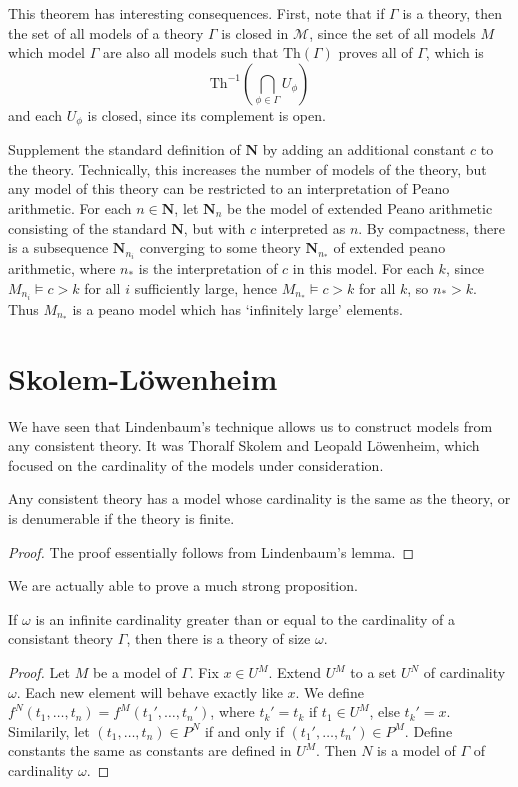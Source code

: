 This theorem has interesting consequences. First, note that if $\Gamma$ is a theory, then the set of all models of a theory $\Gamma$ is closed in $\mathcal{M}$, since the set of all models $M$ which model $\Gamma$ are also all models such that $\text{Th}(\Gamma)$ proves all of $\Gamma$, which is
%
\[ \text{Th}^{-1} \left(\bigcap_{\phi \in \Gamma} U_\phi \right) \]
%
and each $U_\phi$ is closed, since its complement is open.

\begin{example}
    Supplement the standard definition of $\mathbf{N}$ by adding an additional constant $c$ to the theory. Technically, this increases the number of models of the theory, but any model of this theory can be restricted to an interpretation of Peano arithmetic. For each $n \in \mathbf{N}$, let $\mathbf{N}_n$ be the model of extended Peano arithmetic consisting of the standard $\mathbf{N}$, but with $c$ interpreted as $n$. By compactness, there is a subsequence $\mathbf{N}_{n_i}$ converging to some theory $\mathbf{N}_{n_*}$ of extended peano arithmetic, where $n_*$ is the interpretation of $c$ in this model. For each $k$, since $M_{n_i} \vDash c > k$ for all $i$ sufficiently large, hence $M_{n_*} \vDash c > k$ for all $k$, so $n_* > k$. Thus $M_{n_*}$ is a peano model which has `infinitely large' elements.
\end{example}

\section{Skolem-L\"{o}wenheim}

We have seen that Lindenbaum's technique allows us to construct models from any consistent theory. It was Thoralf Skolem and Leopald L\"{o}wenheim, which focused on the cardinality of the models under consideration.

\begin{theorem}
    Any consistent theory has a model whose cardinality is the same as the theory, or is denumerable if the theory is finite.
\end{theorem}
\begin{proof}
    The proof essentially follows from Lindenbaum's lemma.
\end{proof}

We are actually able to prove a much strong proposition.

\begin{corollary}
    If $\omega$ is an infinite cardinality greater than or equal to the cardinality of a consistant theory $\Gamma$, then there is a theory of size $\omega$.
\end{corollary}
\begin{proof}
    Let $M$ be a model of $\Gamma$. Fix $x \in U^M$. Extend $U^M$ to a set $U^N$ of cardinality $\omega$. Each new element will behave exactly like $x$. We define $f^N(t_1, \dots, t_n) = f^M(t_1', \dots, t_n')$, where $t_k' = t_k$ if $t_1 \in U^M$, else $t_k' = x$. Similarily, let $(t_1, \dots, t_n) \in P^N$ if and only if $(t_1', \dots, t_n') \in P^M$. Define constants the same as constants are defined in $U^M$. Then $N$ is a model of $\Gamma$ of cardinality $\omega$.
\end{proof}

